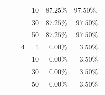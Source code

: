 \documentclass[12pt]{article}
\begin{document}
\begin{description}
\begin{table}[!h]
\begin{tabular}{c*{5}r}
	&  & & 10 & $87.25\%$ & $97.50\%.$\\
	&  & & 30 & $87.25\%$ & $97.50\%$\\
	&  & & 50 & $87.25\%$ & $97.50\%$\\ 
	\cmidrule(lr){3-6}
	&  & 4 & 1 & $0.00\%$ & $3.50\%$\\
	&  &   & 10& $0.00\%$ & $3.50\%$\\
	&  &  & 30 & $0.00\%$ & $3.50\%$\\
	&  &  & 50 & $0.00\%$ & $3.50\%$\\
	\cmidrule(lr){1-6}
	\bottomrule
\end{tabular}
\end{table}
\end{description}
 
\end{document}
